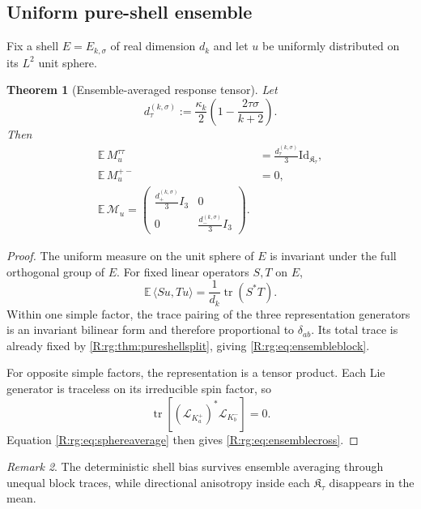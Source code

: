 \documentclass[
 aps,
 prd,
 reprint,
 amsmath,
 amssymb,
 nofootinbib,
 superscriptaddress
]{revtex4-2}
\newtheorem{theorem}{Theorem}[section]
\theoremstyle{definition}
\theoremstyle{remark}
\newtheorem{remark}[theorem]{Remark}
\newcommand{\cM}{\mathscr M}
\newcommand{\Id}{\mathrm{Id}}
\newcommand{\tr}{\operatorname{tr}}
\begin{document}
\subsection{Uniform pure-shell ensemble}

Fix a shell $E=E_{k,\sigma}$ of real dimension $d_k$ and let $u$ be uniformly
distributed on its $L^2$ unit sphere.

\begin{theorem}[Ensemble-averaged response tensor]
\label{R:rg:thm:ensemble}
Let
\begin{equation}
 d_\tau^{(k,\sigma)}
 :=
 \frac{\kappa_k}{2}
 \left(
 1-\frac{2\tau\sigma}{k+2}
 \right).
 \label{R:rg:eq:dtaudef}
\end{equation}
Then
\begin{align}
 \mathbb E\,M^{\tau\tau}_u
 &=
 \frac{d_\tau^{(k,\sigma)}}{3}\Id_{\mathfrak K_\tau},
 \label{R:rg:eq:ensembleblock}\\
 \mathbb E\,M^{+-}_u
 &=
 0,
 \label{R:rg:eq:ensemblecross}\\
 \boxed{
 \mathbb E\,\cM_u
 =
 \begin{pmatrix}
 \frac{d_+^{(k,\sigma)}}{3}I_3 & 0\\
 0 & \frac{d_-^{(k,\sigma)}}{3}I_3
 \end{pmatrix}.
 }
 \label{R:rg:eq:ensembleM}
\end{align}
\end{theorem}

\begin{proof}
The uniform measure on the unit sphere of $E$ is invariant under the full
orthogonal group of $E$.  For fixed linear operators $S,T$ on $E$,
\[
 \mathbb E\,\langle Su,Tu\rangle
 =
 \frac{1}{d_k}\tr(S^*T).
 \label{R:rg:eq:sphereaverage}
\]
Within one simple factor, the trace pairing of the three representation
generators is an invariant bilinear form and therefore proportional to
$\delta_{ab}$.  Its total trace is already fixed by
\cref{R:rg:thm:pureshellsplit}, giving \eqref{R:rg:eq:ensembleblock}.

For opposite simple factors, the representation is a tensor product.
Each Lie generator is traceless on its irreducible spin factor, so
\[
 \tr\!\left[
 (\mathcal L_{K_a^+})^*
 \mathcal L_{K_b^-}
 \right]=0.
\]
Equation \eqref{R:rg:eq:sphereaverage} then gives
\eqref{R:rg:eq:ensemblecross}.
\end{proof}

\begin{remark}
The deterministic shell bias survives ensemble averaging through unequal
block traces, while directional anisotropy inside each
$\mathfrak K_\tau$ disappears in the mean.
\end{remark}
\end{document}
